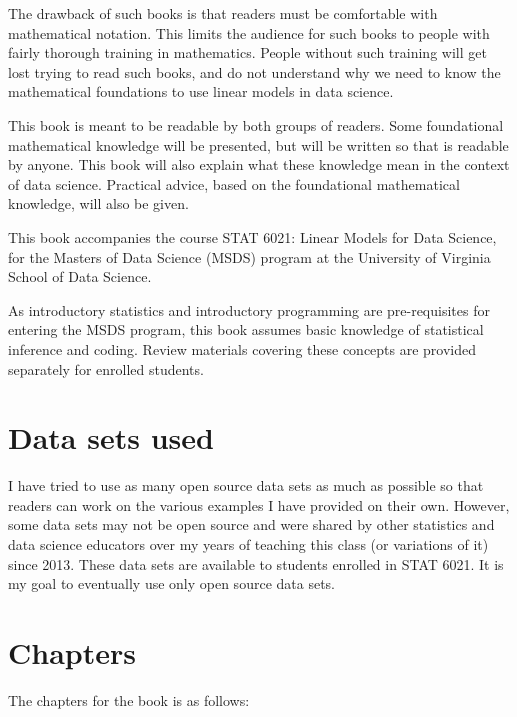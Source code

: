 \documentclass[
]{book}
\begin{document}
The drawback of such books is that readers must be comfortable with mathematical notation. This limits the audience for such books to people with fairly thorough training in mathematics. People without such training will get lost trying to read such books, and do not understand why we need to know the mathematical foundations to use linear models in data science.

This book is meant to be readable by both groups of readers. Some foundational mathematical knowledge will be presented, but will be written so that is readable by anyone. This book will also explain what these knowledge mean in the context of data science. Practical advice, based on the foundational mathematical knowledge, will also be given.

This book accompanies the course STAT 6021: Linear Models for Data Science, for the Masters of Data Science (MSDS) program at the University of Virginia School of Data Science.

As introductory statistics and introductory programming are pre-requisites for entering the MSDS program, this book assumes basic knowledge of statistical inference and coding. Review materials covering these concepts are provided separately for enrolled students.

\hypertarget{data-sets-used}{%
\section*{Data sets used}\label{data-sets-used}}

I have tried to use as many open source data sets as much as possible so that readers can work on the various examples I have provided on their own. However, some data sets may not be open source and were shared by other statistics and data science educators over my years of teaching this class (or variations of it) since 2013. These data sets are available to students enrolled in STAT 6021. It is my goal to eventually use only open source data sets.

\hypertarget{chapters}{%
\section*{Chapters}\label{chapters}}

The chapters for the book is as follows:
\end{document}
